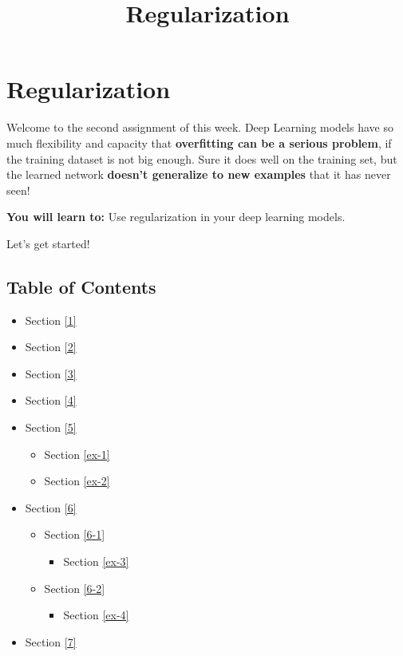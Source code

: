 \documentclass[11pt]{article}
\title{Regularization}
\providecommand{\tightlist}{%
      \setlength{\itemsep}{0pt}\setlength{\parskip}{0pt}}
\begin{document}
    
    \maketitle
    
    

    
    \hypertarget{regularization}{%
\section{Regularization}\label{regularization}}

Welcome to the second assignment of this week. Deep Learning models have
so much flexibility and capacity that \textbf{overfitting can be a
serious problem}, if the training dataset is not big enough. Sure it
does well on the training set, but the learned network \textbf{doesn't
generalize to new examples} that it has never seen!

\textbf{You will learn to:} Use regularization in your deep learning
models.

Let's get started!

    \hypertarget{table-of-contents}{%
\subsection{Table of Contents}\label{table-of-contents}}

\begin{itemize}
\tightlist
\item
  Section \ref{1}
\item
  Section \ref{2}
\item
  Section \ref{3}
\item
  Section \ref{4}
\item
  Section \ref{5}

  \begin{itemize}
  \tightlist
  \item
    Section \ref{ex-1}
  \item
    Section \ref{ex-2}
  \end{itemize}
\item
  Section \ref{6}

  \begin{itemize}
  \tightlist
  \item
    Section \ref{6-1}

    \begin{itemize}
    \tightlist
    \item
      Section \ref{ex-3}
    \end{itemize}
  \item
    Section \ref{6-2}

    \begin{itemize}
    \tightlist
    \item
      Section \ref{ex-4}
    \end{itemize}
  \end{itemize}
\item
  Section \ref{7}
\end{itemize}
\end{document}
